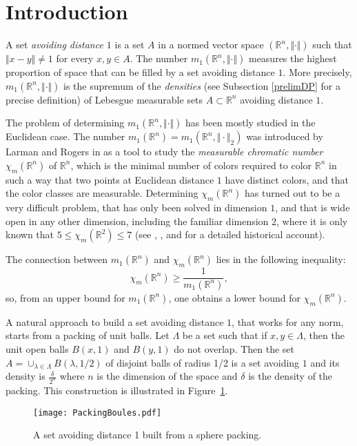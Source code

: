 \documentclass{amsart}                     %
\newcommand{\R}{{\mathbb R}}
\newcommand{\fref}[1]{Figure~\textup{\ref{#1}}}
\begin{document}
\section{Introduction}

\thispagestyle{empty}

A set \textit{avoiding distance $1$} is a set $A$ in a normed vector space $(\R^n,\Vert  \cdot\Vert  )$ such that $\Vert  x-y\Vert  \neq 1$ for every $x,y\in A$. The number $m_1(\R^n,\Vert\cdot\Vert  )$ measures the highest proportion of space that can be filled by a set avoiding distance $1$. More precisely, $m_1(\R^n,\Vert \cdot\Vert  )$ is the supremum of the \textit{densities} (see Subsection \ref{prelimDP} for a precise definition) of Lebesgue measurable sets $A\subset \R^n$ avoiding distance $1$.

The problem of determining $m_1(\R^n,\Vert \cdot \Vert  )$ has been
mostly studied in the Euclidean case. The number
$m_1(\R^n)=m_1(\R^n,\Vert \cdot \Vert  _2)$ was introduced by Larman
and Rogers in \cite{MR0319055} as a tool to study the
\textit{measurable chromatic number} $\chi_m(\R^n)$ of $\R^n$, which is the minimal number of colors required to color $\R^n$ in such a way that two points at Euclidean distance $1$ have distinct colors, and that the color classes are measurable. 
Determining $\chi_m(\R^n)$ has turned out to be a very difficult problem, that has only been solved in dimension $1$, and that is wide 
open in any other dimension, including the familiar dimension $2$,
where it is only known that $5\leq \chi_m(\R^2)\leq 7$ (see
\cite{Falconer}, \cite{MR1954746}, and \cite[Chapter 3]{Soifer} for
a detailed historical account).

The connection between $m_1(\R^n)$ and $\chi_m(\R^n)$ lies in the following inequality:
$$ \chi_m(\R^n) \geq \frac{1}{m_1(\R^n)}, $$
so, from an upper bound for $m_1(\R^n)$, one obtains a lower bound for $ \chi_m(\R^n)$.


A natural approach to build a set avoiding distance $1$, that works for any norm, starts from a packing of unit balls. Let $\Lambda$ be a set such that if $x,y\in \Lambda$, then the unit open balls $B(x,1)$ and $B(y,1)$ do not overlap. Then the set $A=\cup_{\lambda \in \Lambda} B(\lambda,1/2)$ of disjoint balls of radius 1/2 is a set avoiding $1$ and its density is 
$\frac {\delta} {2^n}$ where $n$ is the dimension of the space and $\delta$ is the density of the packing. This construction is illustrated in \fref{PackBoules}.

\begin{figure}[!ht]
\texttt{[image: PackingBoules.pdf]}
\caption{A set avoiding distance 1 built from a sphere packing.\label{PackBoules}}
\end{figure}
\end{document}
